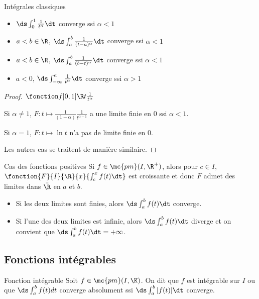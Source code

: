 \begin{theoreme}{Intégrales classiques}{}
    
    \begin{itemize}
        \item $\ds \int_0^1 \frac{1}{t^\alpha} \dt$ converge ssi $\alpha < 1$
        \item $a < b \in \R$, $\ds \int_{a }^{b } \frac 1 {(t - a)^\alpha} \dt$ converge ssi $\alpha < 1$
        \item $a < b \in \R$, $\ds \int_{a }^{b } \frac 1 {(b - t)^\alpha} \dt$ converge ssi $\alpha < 1$
        \item $a < 0$, $\ds \int_{- \infty}^a \frac 1 {t^\alpha} \dt$ converge ssi $\alpha > 1$
    \end{itemize}
\end{theoreme}

\begin{proof}
    $\fonction f {]0, 1]}{\R}{t}{\frac{1}{t^\alpha}}$ 

    Si $\alpha \neq 1$, $F : t \mapsto \frac 1 {(1 - \alpha)} \frac{1}{t^{\alpha - 1}}$ a 
    une limite finie en $0$ ssi $\alpha < 1$. 

    Si $\alpha = 1$, $F : t \mapsto \ln t$ n'a pas de limite finie en $0$.

    Les autres cas se traitent de manière similaire. 
\end{proof}


\begin{proposition}{Cas des fonctions positives}{}
    Si $f \in \mc{pm}(I, \R^+)$, alors pour $c \in I$, $\fonction{F}{I}{\R}{x}{\int_c^x f(t) \dt}$ est croissante
    et donc $F$ admet des limites dans $\bar \R$ en $a$ et $b$.

    \begin{itemize}
        \item Si les deux limites sont finies, alors $\ds \int_a^b f(t) \dt$ converge.
        \item Si l'une des deux limites est infinie, alors $\ds \int_a^b f(t) \dt$ diverge et on convient 
        que $\ds \int_a^b f(t) \dt = + \infty$.
    \end{itemize}
\end{proposition}


\subsection{Fonctions intégrables }

\begin{definition}{Fonction intégrable}{}
    Soit $f \in \mc{pm}(I, \K)$. On dit que $f$ est intégrable sur $I$ ou que 
    $\ds \int_a^b f(t) dt$ converge absolument ssi $\ds \int_a^b |f(t)| \dt$ converge.
\end{definition}

